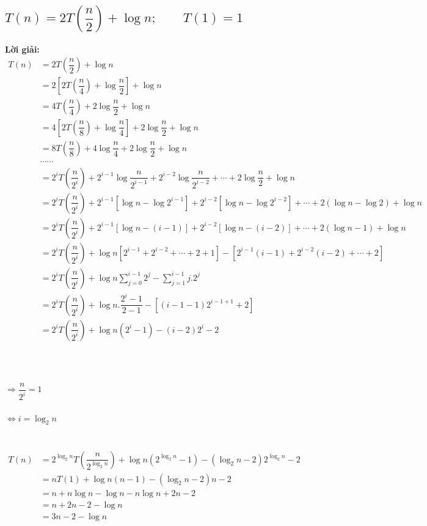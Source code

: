 \documentclass[12pt, letterpaper]{article}
\begin{document}
\subsection{$T(n) = 2T(\dfrac{n}{2}) + \log n; \quad \quad T(1) = 1$}
\textbf{Lời giải:} \\
$ \begin{aligned}
    T(n) &= 2T(\dfrac{n}{2}) + \log n \\
        &= 2[2T(\dfrac{n}{4}) + \log \dfrac{n}{2}] + \log n \\
        &= 4T(\dfrac{n}{4}) + 2\log \dfrac{n}{2} + \log n \\
        &= 4[2T(\dfrac{n}{8}) + \log \dfrac{n}{4}] + 2\log \dfrac{n}{2} + \log n \\
        &= 8T(\dfrac{n}{8}) + 4\log \dfrac{n}{4} + 2\log \dfrac{n}{2} + \log n \\
        &\cdots \cdots \\
        &= 2^iT(\dfrac{n}{2^i}) + 2^{i-1}\log \dfrac{n}{2^{i-1}} + 2^{i-2}\log \dfrac{n}{2^{i-2}} + \cdots + 2\log \dfrac{n}{2} + \log n \\
        &= 2^iT(\dfrac{n}{2^i}) + 2^{i-1}[\log n - \log 2^{i-1}] + 2^{i-2}[\log n - \log 2^{i-2}] + \cdots + 2(\log n - \log 2) + \log n \\
        &= 2^iT(\dfrac{n}{2^i}) + 2^{i-1}[\log n - (i-1)] + 2^{i-2}[\log n - (i-2)] + \cdots + 2(\log n - 1) + \log n \\
        &= 2^iT(\dfrac{n}{2^i}) + \log n[2^{i-1} + 2^{i-2} + \cdots + 2 + 1] - [2^{i-1}(i-1) + 2^{i-2}(i-2) + \cdots + 2] \\
        &= 2^iT(\dfrac{n}{2^i}) + \log n \sum_{j=0}^{i-1} 2^j - \sum_{j=1}^{i-1} j.2^j \\
        &= 2^iT(\dfrac{n}{2^i}) + \log n. \dfrac{2^i - 1}{2 - 1} - [(i - 1 - 1)2^{i - 1 + 1} + 2] \\
        &= 2^iT(\dfrac{n}{2^i}) + \log n(2^i - 1) - (i-2)2^i - 2 \\
\end{aligned} $ \\ \\ \\
 \\
$\Rightarrow \dfrac{n}{2^i} = 1$ \\ \\
$\Leftrightarrow i = \log_2{n}$ \\ \\
 \\
$ \begin{aligned}
    T(n) &= 2^{\log_2{n}}T(\dfrac{n}{2^{\log_2{n}}}) + \log n(2^{\log_2{n}} - 1) - (\log_2{n} - 2)2^{\log_2{n}} - 2 \\
        &= nT(1) + \log n(n - 1) - (\log_2{n} - 2)n - 2 \\
        &= n + n\log n - \log n - n\log n + 2n - 2 \\
        &= n + 2n - 2 - \log n\\
        &= 3n - 2 - \log n
\end{aligned} $\\
\end{document}
